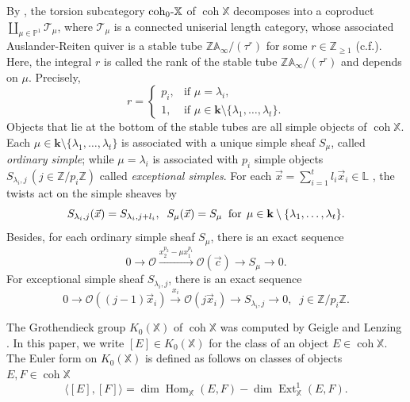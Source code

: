 \documentclass[11pt,a4paper,reqno]{amsart}%
\theoremstyle{plain}
\theoremstyle{definition}
\numberwithin{equation}{section}
\numberwithin{equation}{section}
\def\<{\langle}
\def\>{\rangle}
\def\XX{\mathbb{X}}
\newcommand{\vx}{\vec{x}}
\newcommand{\Hom}{\operatorname{Hom}\nolimits}
\newcommand{\Ext}{\operatorname{Ext}\nolimits}
\def\coh{\operatorname{coh}}
\def\Hom{\operatorname{Hom}}
\def\Ext{\operatorname{Ext}}
\newcommand{\cO}{\mathcal{O}}
\def\coh{\operatorname{coh}}
\begin{document}
By \cite[Proposition 1.1]{LR}, the torsion subcategory ${\rm coh}_0\mbox{-}\mathbb{X}$ of $\coh\XX$ decomposes into a coproduct
$\coprod_{\mu\in \mathbb{P}^1}\mathcal{T}_{\mu}$, where $\mathcal{T}_{\mu}$ is a connected uniserial length category, whose associated Auslander-Reiten quiver is a stable tube $\mathbb{ZA}_{\infty}/(\tau^r)$ for some $r\in \mathbb{Z}_{\geq 1}$ (c.f.\cite{ASS}). Here, the integral $r$ is called the rank of the stable tube $\mathbb{ZA}_{\infty}/(\tau^r)$ and depends on $\mu$. 
Precisely, 
\[
r=\begin{cases}
p_i, &\text{if }   \mu=\lambda_i,\\
1,   &\text{if $\mu\in   \mathbf{k}\setminus \{ \lambda_1,\ldots,\lambda_t\}$.}\end{cases} 
\] 
Objects that lie at the bottom of the stable tubes are all simple objects of $\coh\XX$. Each $\mu\in   \mathbf{k}\setminus \{ \lambda_1,\ldots,\lambda_t\}$ is associated with a unique simple sheaf $S_{\mu}$, called \emph{ordinary simple}; while $\mu=\lambda_i$   is associated with $p_i$  simple objects $ S_{\lambda_i,j} \, (j\in \mathbb{Z}/p_i\mathbb{Z}) $ 
called \emph{exceptional simples}. 
 For each $\vec{x}= \sum_{i=1}^t l_i\vx_i\in \mathbb{L}$ , the twists act on the simple sheaves by  
\begin{equation}\label{shift}
 S_{\lambda_i,j} (\vec{x})=S_{\lambda_i, j+l_{i}},\;\;   S_{\mu}(\vec{x})=S_{\mu}\;\;{\rm for}\;\, \mu\in  \mathbf{k}\setminus \{ \lambda_1,\ldots,\lambda_t\}.    
\end{equation}
Besides, for each ordinary simple sheaf $S_{\mu}$, there is an
 exact sequence
$$0\longrightarrow \mathcal{O}\stackrel{x_2^{p_2}-\mu x_1^{p_1}}{\longrightarrow}\mathcal{O}(\vec{c})\longrightarrow S_{\mu}\longrightarrow 0.$$
For exceptional simple sheaf  $ S_{\lambda_i,j} $, there is an exact sequence 
\begin{equation}\label{es}
    0\longrightarrow \mathcal{O}((j-1)\vec{x}_i)\stackrel{x_i}{\longrightarrow} \mathcal{O}(j\vec{x}_i)\longrightarrow  S_{\lambda_i,j} \longrightarrow 0,\;\;j\in\mathbb{Z}/p_i\mathbb{Z}.
\end{equation}

The Grothendieck group $K_{0}(\XX)$ of $\coh\XX$  was computed by Geigle and Lenzing \cite{GL87}. In this paper, we   write  $[E] \in  K_{0}(\XX)$
 for the class of an object $E \in \coh\XX$. The Euler form on $K_{0}(\XX)$ is defined as follows on classes of objects $E,F \in \coh\XX$
\[
\<[E],[F]\>= \dim\Hom_\XX(E,F)-\dim\Ext^1_\XX(E,F).
\] 
\end{document}
